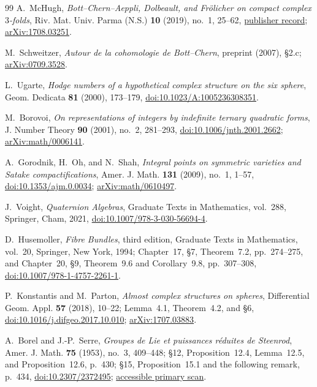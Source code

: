 \begin{thebibliography}{99}
A.~McHugh,
\emph{Bott--Chern--Aeppli, Dolbeault, and Fr\"olicher on compact complex
$3$-folds},
Riv. Mat. Univ. Parma (N.S.) \textbf{10} (2019), no.~1, 25--62,
\href{https://www.rivmat.unipr.it/vols/2019-10-1/02-mchugh.html}%
{publisher record};
\href{https://arxiv.org/abs/1708.03251}{arXiv:1708.03251}.

M.~Schweitzer,
\emph{Autour de la cohomologie de Bott--Chern},
preprint (2007), \S2.c;
\href{https://arxiv.org/abs/0709.3528}{arXiv:0709.3528}.

L.~Ugarte,
\emph{Hodge numbers of a hypothetical complex structure on the six sphere},
Geom. Dedicata \textbf{81} (2000), 173--179,
\href{https://doi.org/10.1023/A:1005236308351}%
{doi:10.1023/A:1005236308351}.

M.~Borovoi,
\emph{On representations of integers by indefinite ternary quadratic forms},
J. Number Theory \textbf{90} (2001), no.~2, 281--293,
\href{https://doi.org/10.1006/jnth.2001.2662}%
{doi:10.1006/jnth.2001.2662};
\href{https://arxiv.org/abs/math/0006141}{arXiv:math/0006141}.

A.~Gorodnik, H.~Oh, and N.~Shah,
\emph{Integral points on symmetric varieties and Satake compactifications},
Amer. J. Math. \textbf{131} (2009), no.~1, 1--57,
\href{https://doi.org/10.1353/ajm.0.0034}{doi:10.1353/ajm.0.0034};
\href{https://arxiv.org/abs/math/0610497}{arXiv:math/0610497}.

J.~Voight,
\emph{Quaternion Algebras}, Graduate Texts in Mathematics, vol.~288,
Springer, Cham, 2021,
\href{https://doi.org/10.1007/978-3-030-56694-4}%
{doi:10.1007/978-3-030-56694-4}.

D.~Husemoller,
\emph{Fibre Bundles}, third edition,
Graduate Texts in Mathematics, vol.~20, Springer, New York, 1994;
Chapter~17, \S7, Theorem~7.2, pp.~274--275, and
Chapter~20, \S9, Theorem~9.6 and Corollary~9.8, pp.~307--308,
\href{https://doi.org/10.1007/978-1-4757-2261-1}%
{doi:10.1007/978-1-4757-2261-1}.

P.~Konstantis and M.~Parton,
\emph{Almost complex structures on spheres},
Differential Geom. Appl. \textbf{57} (2018), 10--22;
Lemma~4.1, Theorem~4.2, and \S6,
\href{https://doi.org/10.1016/j.difgeo.2017.10.010}%
{doi:10.1016/j.difgeo.2017.10.010};
\href{https://arxiv.org/abs/1707.03883}{arXiv:1707.03883}.

A.~Borel and J.-P.~Serre,
\emph{Groupes de Lie et puissances r\'eduites de Steenrod},
Amer. J. Math. \textbf{75} (1953), no.~3, 409--448;
\S12, Proposition~12.4, Lemma~12.5, and Proposition~12.6, p.~430;
\S15, Proposition~15.1 and the following remark, p.~434,
\href{https://doi.org/10.2307/2372495}{doi:10.2307/2372495};
\href{https://www.maths.ed.ac.uk/~v1ranick/papers/borelserre.pdf}%
{accessible primary scan}.


\end{thebibliography}
